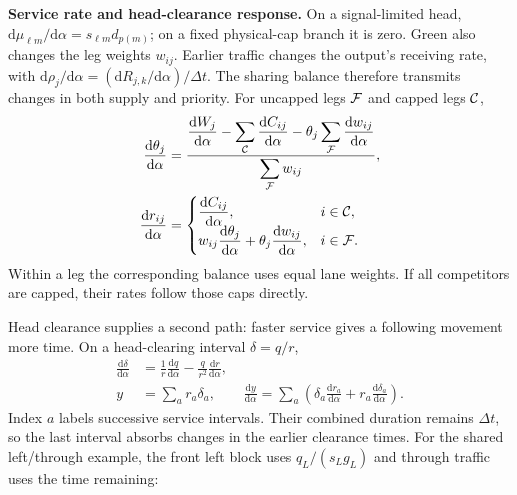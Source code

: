 \documentclass[10pt,a4paper]{article}
\newenvironment{revision}{\begingroup\color{revisionred}}{\par\endgroup}
\begin{document}
\begin{revision}
\textbf{Service rate and head-clearance response.}
On a signal-limited head,
$\mathrm d\mu_{\ell m}/\mathrm d\alpha=s_{\ell m}d_{p(m)}$;
on a fixed physical-cap branch it is zero. Green also changes the leg
weights $w_{ij}$. Earlier traffic changes the output's receiving rate,
with $\mathrm d\rho_j/\mathrm d\alpha=(\mathrm dR_{j,k}/\mathrm d\alpha)/\Delta t$.
The sharing balance therefore transmits changes in both supply and priority.
For uncapped legs ${\cal F}$ and capped legs ${\cal C}$,
\begin{equation}
 \begin{aligned}
 \frac{\mathrm d\theta_j}{\mathrm d\alpha}
 &=\frac{\displaystyle
 \frac{\mathrm dW_j}{\mathrm d\alpha}
 -\sum_{\cal C}\frac{\mathrm dC_{ij}}{\mathrm d\alpha}
 -\theta_j\sum_{\cal F}\frac{\mathrm dw_{ij}}{\mathrm d\alpha}}
 {\displaystyle\sum_{\cal F}w_{ij}},\\
 \frac{\mathrm dr_{ij}}{\mathrm d\alpha}
 &=\begin{cases}
 \displaystyle\frac{\mathrm dC_{ij}}{\mathrm d\alpha},&i\in{\cal C},\\
 \displaystyle w_{ij}\frac{\mathrm d\theta_j}{\mathrm d\alpha}
       +\theta_j\frac{\mathrm dw_{ij}}{\mathrm d\alpha},&i\in{\cal F}.
 \end{cases}
 \end{aligned}
 \label{eq:compact-sharing-derivative}
\end{equation}
Within a leg the corresponding balance uses equal lane weights. If all
competitors are capped, their rates follow those caps directly.

Head clearance supplies a second path: faster service gives a following
movement more time. On a head-clearing interval $\delta=q/r$,
\begin{equation}
 \begin{aligned}
 \frac{\mathrm d\delta}{\mathrm d\alpha}
 &=\frac1r\frac{\mathrm dq}{\mathrm d\alpha}
      -\frac q{r^2}\frac{\mathrm dr}{\mathrm d\alpha},\\
 y&=\sum_a r_a\delta_a,\qquad
 \frac{\mathrm dy}{\mathrm d\alpha}
 =\sum_a\left(\delta_a\frac{\mathrm dr_a}{\mathrm d\alpha}
              +r_a\frac{\mathrm d\delta_a}{\mathrm d\alpha}\right).
 \end{aligned}
 \label{eq:compact-service-derivative}
\end{equation}
Index $a$ labels successive service intervals. Their combined duration
remains $\Delta t$, so the last interval absorbs changes in the earlier
clearance times. For the shared left/through example, the front left
block uses $q_L/(s_Lg_L)$ and through traffic uses the time remaining:
\end{revision}
\end{document}
